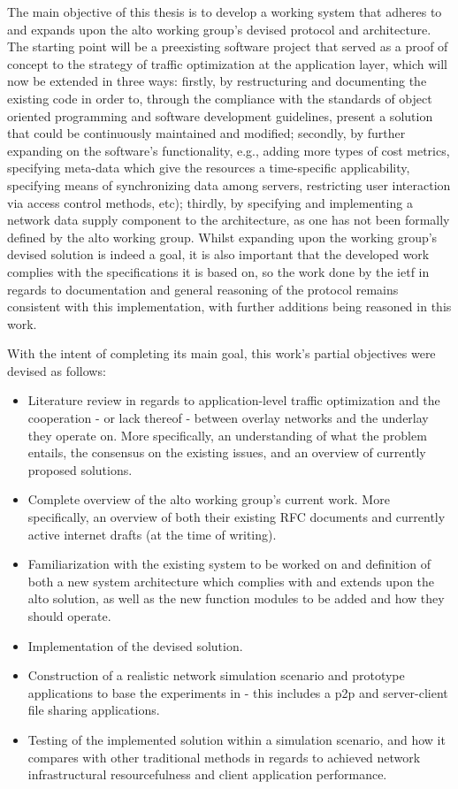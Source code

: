     The main objective of this thesis is to develop a working system that adheres to and expands upon the \gls{alto} working group's devised protocol and architecture.
    The starting point will be a preexisting software project that served as a proof of concept to the strategy of traffic optimization at the application layer, which will now be extended in three ways: firstly, by restructuring and documenting the existing code in order to, through the compliance with the standards of object oriented programming and software development guidelines, present a solution that could be continuously maintained and modified; secondly, by further expanding on the software's functionality, e.g., adding more types of cost metrics, specifying meta-data which give the resources a time-specific applicability, specifying means of synchronizing data among servers, restricting user interaction via access control methods, etc); thirdly, by specifying and implementing a network data supply component to the architecture, as one has not been formally defined by the \gls{alto} working group.
    Whilst expanding upon the working group's devised solution is indeed a goal, it is also important that the developed work complies with the specifications it is based on, so the work done by the \gls{ietf} in regards to documentation and general reasoning of the protocol remains consistent with this implementation, with further additions being reasoned in this work.

    With the intent of completing its main goal, this work's partial objectives were devised as follows:

\begin{itemize}
    \item Literature review in regards to application-level traffic optimization and the cooperation - or lack thereof - between overlay networks and the underlay they operate on.
        More specifically, an understanding of what the problem entails, the consensus on the existing issues, and an overview of currently proposed solutions.
    \item Complete overview of the \gls{alto} working group's current work.
        More specifically, an overview of both their existing RFC documents and currently active internet drafts (at the time of writing).
    \item Familiarization with the existing system to be worked on and definition of both a new system architecture which complies with and extends upon the \gls{alto} solution, as well as the new function modules to be added and how they should operate.
    \item Implementation of the devised solution.
    \item Construction of a realistic network simulation scenario and prototype applications to base the experiments in - this includes a \gls{p2p} and server-client file sharing applications.
    \item Testing of the implemented solution within a simulation scenario, and how it compares with other traditional methods in regards to achieved network infrastructural resourcefulness and client application performance.
\end{itemize}

